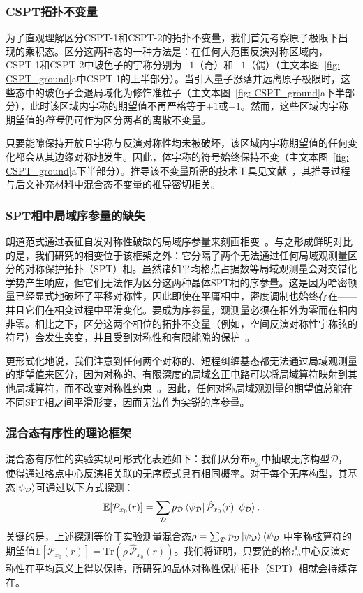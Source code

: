 \documentclass[preprint,superscriptaddress,floatfix, nofootinbib]{revtex4-2}
\begin{document}
\begin{CJK*}{UTF8}{gbsn}
\subsubsection*{CSPT拓扑不变量}

为了直观理解区分CSPT-1和CSPT-2的拓扑不变量，我们首先考察原子极限下出现的乘积态。区分这两种态的一种方法是：在任何大范围反演对称区域内，CSPT-1和CSPT-2中玻色子的宇称分别为$-1$（奇）和$+1$（偶）（主文本图~\ref{fig: CSPT_ground}a中CSPT-1的上半部分）。当引入量子涨落并远离原子极限时，这些态中的玻色子会退局域化为修饰准粒子（主文本图~\ref{fig: CSPT_ground}a下半部分），此时该区域内宇称的期望值不再严格等于$+1$或$-1$。然而，这些区域内宇称期望值的\textit{符号}仍可作为区分两者的离散不变量。

只要能隙保持开放且宇称与反演对称性均未被破坏，该区域内宇称期望值的任何变化都会从其边缘对称地发生。因此，体宇称的符号始终保持不变（主文本图~\ref{fig: CSPT_ground}a下半部分）。推导该不变量所需的技术工具见文献~\cite{Fuji2015}，其推导过程与后文补充材料中混合态不变量的推导密切相关。
\subsubsection*{SPT相中局域序参量的缺失}
朗道范式通过表征自发对称性破缺的局域序参量来刻画相变~\cite{Landau1937, Beekman2019}。与之形成鲜明对比的是，我们研究的相变位于该框架之外：它分隔了两个无法通过任何局域观测量区分的对称保护拓扑（SPT）相。虽然诸如平均格点占据数等局域观测量会对交错化学势产生响应，但它们无法作为区分这两种晶体SPT相的序参量。这是因为哈密顿量已经显式地破坏了平移对称性，因此即使在平庸相中，密度调制也始终存在——并且它们在相变过程中平滑变化。要成为序参量，观测量必须在相外为零而在相内非零。相比之下，区分这两个相位的拓扑不变量（例如，空间反演对称性宇称弦的符号）会发生突变，并且受到对称性和有限能隙的保护~\cite{Fuji2015, Pollmann2012}。

更形式化地说，我们注意到任何两个对称的、短程纠缠基态都无法通过局域观测量的期望值来区分，因为对称的、有限深度的局域幺正电路可以将局域算符映射到其他局域算符，而不改变对称性约束~\cite{Chen2010, Chen2011}。因此，任何对称局域观测量的期望值总能在不同SPT相之间平滑形变，因而无法作为尖锐的序参量。
\subsubsection*{混合态有序性的理论框架}
混合态有序性的实验实现可形式化表述如下：我们从分布$p_{\mathcal{D}}$中抽取无序构型$\mathcal{D}$，使得通过格点中心反演相关联的无序模式具有相同概率。对于每个无序构型，其基态$\ket{\psi_{\mathcal{D}}}$可通过以下方式探测：
\begin{equation}
    \mathbb{E}[\mathcal{P}_{x_0}(r)] = \sum_{\mathcal{D}} p_{\mathcal{D}} \bra{\psi_{\mathcal{D}}} \hat{\mathcal{P}}_{x_0}(r)\ket{\psi_{\mathcal{D}}}.
\end{equation}
关键的是，上述探测等价于实验测量混合态$\rho = \sum_{\mathcal{D}} p_{\mathcal{D}} \ket{\psi_{\mathcal{D}}} \bra{\psi_{\mathcal{D}}}$中宇称弦算符的期望值$\mathbb{E}[\mathcal{P}_{x_0}(r)] = \text{Tr}\left( \rho\,  \hat{\mathcal{P}}_{x_0}(r)\right)$。我们将证明，只要链的格点中心反演对称性在平均意义上得以保持，所研究的晶体对称性保护拓扑（SPT）相就会持续存在。


\end{CJK*}
\end{document}
